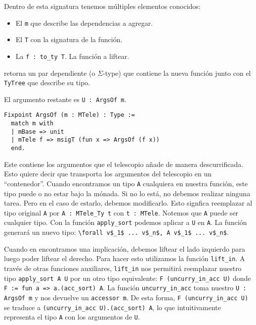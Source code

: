 Dentro de esta signatura tenemos múltiples elementos conocidos:
\begin{itemize}
  \item El  \lstinline{m} que describe las dependencias a agregar.
  \item El  \lstinline{T} con la signatura de la función.
  \item La  \lstinline{f : to_ty T}. La función a liftear.
\end{itemize}

\lift retorna un par dependiente (o $\Sigma$-type) que contiene la nueva función junto con el \lstinline{TyTree} que describe su tipo.

El argumento restante es \lstinline{U : ArgsOf m}.

\begin{lstlisting}[frame=tb,caption={Definición de \lstinline{ArgsOf}},label=lst:ArgsOf]
Fixpoint ArgsOf (m : MTele) : Type :=
  match m with
  | mBase => unit
  | mTele f => msigT (fun x => ArgsOf (f x))
  end.
\end{lstlisting}

Este contiene los argumentos que el telescopio añade de manera descurrificada.
Esto quiere decir que transporta los argumentos del telescopio en un ``contenedor''.
Cuando encontramos un tipo \lstinline{A} cualquiera en nuestra función, este tipo puede o no estar bajo la mónada.
Si no lo está, no debemos realizar ninguna tarea.
Pero en el caso de estarlo, debemos modificarlo. Esto signfica reemplazar al tipo original \lstinline{A} por \lstinline{A : MTele_Ty t} con \lstinline{t : MTele}.
Notemos que \lstinline{A} puede ser cualquier tipo.
Con la función \lstinline{apply_sort} podemos aplicar a \lstinline{U} en \lstinline{A}. La función generará un nuevo tipo: \lstinline{\forall v$_1$ ... v$_n$, A v$_1$ ... v$_n$}.

Cuando en \lift encontramos una implicación, debemos liftear el lado izquierdo para luego poder liftear el derecho.
Para hacer esto utilizamos la función \lstinline{lift_in}.
A través de otras funciones auxiliares, \lstinline{lift_in} nos permitirá reemplazar nuestro tipo \lstinline{apply_sort A U} por un otro tipo equivalente: \lstinline{F (uncurry_in_acc U)} donde \lstinline{F := fun a => a.(acc_sort) A}.
La función \lstinline{uncurry_in_acc} toma nuestro \lstinline{U : ArgsOf m} y nos devuelve un \lstinline{accessor m}.
De esta forma, \lstinline{F (uncurry_in_acc U)} se traduce a \lstinline{(uncurry_in_acc U).(acc_sort) A}, lo que intuitivamente representa el tipo \lstinline{A} con los argumentos de \lstinline{U}.

